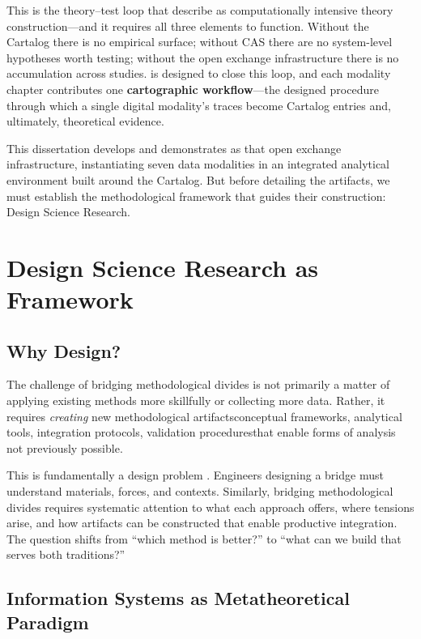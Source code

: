 \documentclass[../main.tex]{subfiles}
\begin{document}
This is the theory--test loop that \textcite{miranda2022computationally} describe as computationally intensive theory construction---and it requires all three elements to function. Without the Cartalog there is no empirical surface; without CAS there are no system-level hypotheses worth testing; without the open exchange infrastructure there is no accumulation across studies. \RoleBox{} is designed to close this loop, and each modality chapter contributes one \textbf{cartographic workflow}---the designed procedure through which a single digital modality's traces become Cartalog entries and, ultimately, theoretical evidence.

This dissertation develops and demonstrates \RoleBox{} as that open exchange infrastructure, instantiating seven data modalities in an integrated analytical environment built around the Cartalog. But before detailing the artifacts, we must establish the methodological framework that guides their construction: Design Science Research.


\section{Design Science Research as Framework}
\label{sec:intro:dsr}

\subsection{Why Design?}

The challenge of bridging methodological divides is not primarily a matter of applying existing methods more skillfully or collecting more data. Rather, it requires \emph{creating} new methodological artifacts\textemdash conceptual frameworks, analytical tools, integration protocols, validation procedures\textemdash that enable forms of analysis not previously possible.

This is fundamentally a design problem \cite{simon1996sciences}. Engineers designing a bridge must understand materials, forces, and contexts. Similarly, bridging methodological divides requires systematic attention to what each approach offers, where tensions arise, and how artifacts can be constructed that enable productive integration. The question shifts from ``which method is better?'' to ``what can we build that serves both traditions?''

\subsection{Information Systems as Metatheoretical Paradigm}
\end{document}
